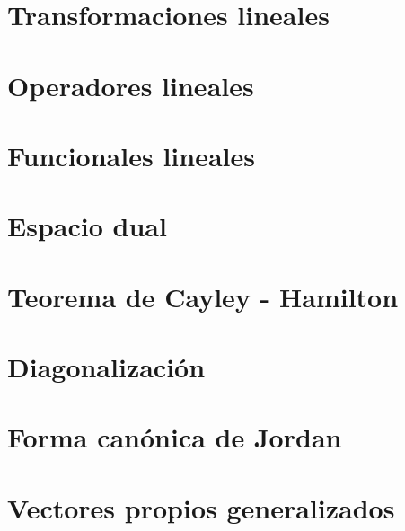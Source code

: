\section{Transformaciones lineales}


\section{Operadores lineales}


\section{Funcionales lineales}


\section{Espacio dual}


\section{Teorema de Cayley - Hamilton}


\section{Diagonalización}


\section{Forma canónica de Jordan}


\section{Vectores propios generalizados}